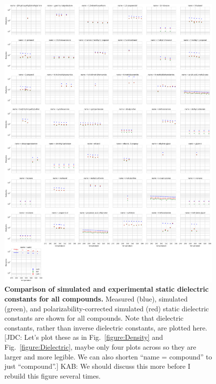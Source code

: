 \documentclass[aps,pre,twocolumn,nofootinbib,superscriptaddress,linenumbers]{revtex4-1}
\begin{document}
\begin{figure}

\includegraphics[width=\textwidth]{./figures/dielectric_versus_temperature_all.pdf}

\caption{{\bf Comparison of simulated and experimental static dielectric constants for all compounds.}
Measured (blue), simulated (green), and polarizability-corrected simulated (red) static dielectric constants are shown for all compounds.
Note that dielectric constants, rather than inverse dielectric constants, are plotted here.
{\color{red}[JDC: Let's plot these as in Fig.~\ref{figure:Density} and Fig.~\ref{figure:Dielectric}, maybe only four plots across so they are larger and more legible.  We can also shorten ``name = compound'' to just ``compound''.]
KAB: We should discuss this more before I rebuild this figure several times.}
}
\label{figure:AllDielectrics}

\end{figure}
\end{document}
